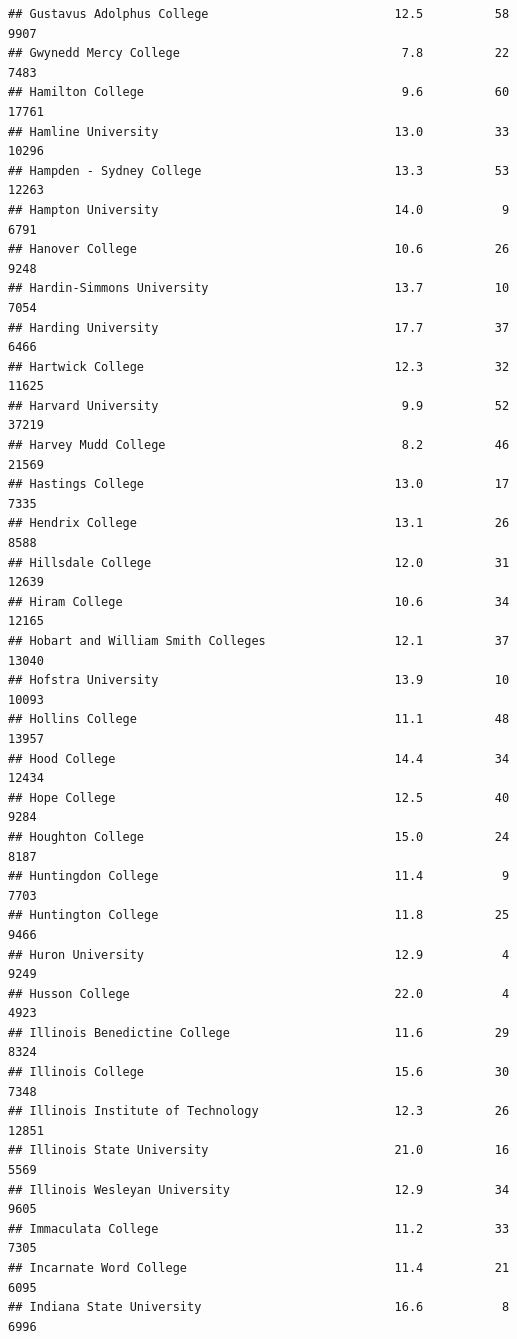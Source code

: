 \documentclass[
]{article}
\begin{document}
\begin{verbatim}
## Gustavus Adolphus College                          12.5          58   9907
## Gwynedd Mercy College                               7.8          22   7483
## Hamilton College                                    9.6          60  17761
## Hamline University                                 13.0          33  10296
## Hampden - Sydney College                           13.3          53  12263
## Hampton University                                 14.0           9   6791
## Hanover College                                    10.6          26   9248
## Hardin-Simmons University                          13.7          10   7054
## Harding University                                 17.7          37   6466
## Hartwick College                                   12.3          32  11625
## Harvard University                                  9.9          52  37219
## Harvey Mudd College                                 8.2          46  21569
## Hastings College                                   13.0          17   7335
## Hendrix College                                    13.1          26   8588
## Hillsdale College                                  12.0          31  12639
## Hiram College                                      10.6          34  12165
## Hobart and William Smith Colleges                  12.1          37  13040
## Hofstra University                                 13.9          10  10093
## Hollins College                                    11.1          48  13957
## Hood College                                       14.4          34  12434
## Hope College                                       12.5          40   9284
## Houghton College                                   15.0          24   8187
## Huntingdon College                                 11.4           9   7703
## Huntington College                                 11.8          25   9466
## Huron University                                   12.9           4   9249
## Husson College                                     22.0           4   4923
## Illinois Benedictine College                       11.6          29   8324
## Illinois College                                   15.6          30   7348
## Illinois Institute of Technology                   12.3          26  12851
## Illinois State University                          21.0          16   5569
## Illinois Wesleyan University                       12.9          34   9605
## Immaculata College                                 11.2          33   7305
## Incarnate Word College                             11.4          21   6095
## Indiana State University                           16.6           8   6996

\end{verbatim}
\end{document}

